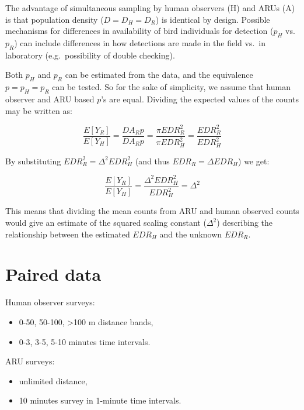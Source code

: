 \documentclass[12pt,]{book}
\newenvironment{Shaded}{\begin{snugshade}}{\end{snugshade}}
\newcommand{\KeywordTok}[1]{\textcolor[rgb]{0.13,0.29,0.53}{\textbf{#1}}}
\newcommand{\NormalTok}[1]{#1}
\newcommand{\OperatorTok}[1]{\textcolor[rgb]{0.81,0.36,0.00}{\textbf{#1}}}
\newcommand{\StringTok}[1]{\textcolor[rgb]{0.31,0.60,0.02}{#1}}
\providecommand{\tightlist}{%
  \setlength{\itemsep}{0pt}\setlength{\parskip}{0pt}}
\begin{document}
The advantage of simultaneous sampling by human observers (H) and ARUs (A)
is that population density (\(D=D_{H}=D_{R}\)) is identical by design.
Possible mechanisms for differences in availability of bird individuals for detection
(\(p_{H}\) vs. \(p_{R}\)) can include differences in how detections
are made in the field vs.~in laboratory (e.g.~possibility of double checking).

Both \(p_{H}\) and \(p_{R}\) can be estimated from the data, and the equivalence
\(p=p_{H}=p_{R}\) can be tested. So for the sake of simplicity, we assume that
human observer and ARU based \(p\)'s are equal.
Dividing the expected values of the counts may be written as:

\[\frac{E[Y_{R}]}{E[Y_{H}]} = \frac{D A_{R} p}{D A_{R} p} = \frac{\pi EDR_{R}^2}{\pi EDR_{H}^2} = \frac{EDR_{R}^2}{EDR_{H}^2}\]

By substituting \(EDR_{R}^2 = \Delta^2 EDR_{H}^2\) (and thus \(EDR_{R} = \Delta EDR_{H}\)) we get:

\[\frac{E[Y_{R}]}{E[Y_{H}]} = \frac{\Delta^2 EDR_{H}^2}{EDR_{H}^2} = \Delta^2\]

This means that dividing the mean counts from ARU and human observed counts
would give an estimate of the squared scaling constant (\(\Delta^2\)) describing the
relationship between the estimated \(EDR_{H}\) and the unknown \(EDR_{R}\).

\hypertarget{paired-data}{%
\section{Paired data}\label{paired-data}}

Human observer surveys:

\begin{itemize}
\tightlist
\item
  0-50, 50-100, \textgreater{}100 m distance bands,
\item
  0-3, 3-5, 5-10 minutes time intervals.
\end{itemize}

ARU surveys:

\begin{itemize}
\tightlist
\item
  unlimited distance,
\item
  10 minutes survey in 1-minute time intervals.
\end{itemize}

\begin{Shaded}
\end{Shaded}
\end{document}
